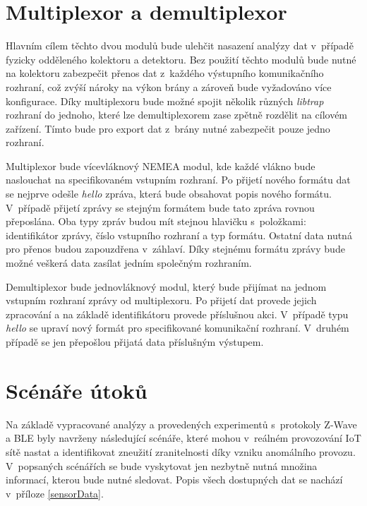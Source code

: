   \newpage
 \section{Multiplexor a demultiplexor}
 Hlavním cílem těchto dvou modulů bude ulehčit nasazení analýzy dat v~případě fyzicky odděleného
 kolektoru a detektoru. Bez použití těchto modulů bude nutné na kolektoru zabezpečit přenos dat
 z~každého výstupního komunikačního rozhraní, což zvýší nároky na výkon brány a zároveň bude vyžadováno
 více konfigurace. Díky multiplexoru bude možné spojit několik různých \textit{libtrap} 
 rozhraní do jednoho, které lze demultiplexorem zase zpětně rozdělit na cílovém zařízení.
 Tímto bude pro export dat z~brány nutné zabezpečit pouze jedno rozhraní.

 Multiplexor bude vícevláknový NEMEA modul, kde každé vlákno bude naslouchat na specifikovaném
 vstupním rozhraní. Po přijetí nového formátu dat se nejprve odešle \textit{hello} zpráva, která
 bude obsahovat popis nového formátu. V~případě přijetí zprávy se stejným formátem bude tato 
 zpráva rovnou přeposlána. Oba typy zpráv budou mít stejnou hlavičku s~položkami: 
 identifikátor zprávy, 
 číslo vstupního rozhraní a typ formátu. Ostatní data nutná pro přenos budou zapouzdřena
v~záhlaví. Díky stejnému formátu zprávy bude možné veškerá data zasílat jedním společným rozhraním.
 
 Demultiplexor bude jednovláknový modul, který bude přijímat na jednom vstupním rozhraní zprávy
 od multiplexoru. Po přijetí dat provede jejich zpracování a na základě identifikátoru 
 provede příslušnou akci. V~případě typu \textit{hello} se upraví nový formát pro specifikované 
 komunikační rozhraní. V~druhém případě se jen přepošlou přijatá data příslušným výstupem.
 
 \newpage
 \section{Scénáře útoků} \label{utoky}
 Na základě vypracované analýzy a provedených experimentů s~protokoly Z-Wave a BLE byly navrženy
 následující scénáře, které mohou v~reálném provozování IoT sítě nastat a identifikovat zneužití
 zranitelnosti díky vzniku anomálního provozu. V~popsaných scénářích se bude vyskytovat jen nezbytně
 nutná množina informací, kterou bude nutné sledovat. Popis všech dostupných dat se nachází
 v~příloze \ref{sensorData}.
 
